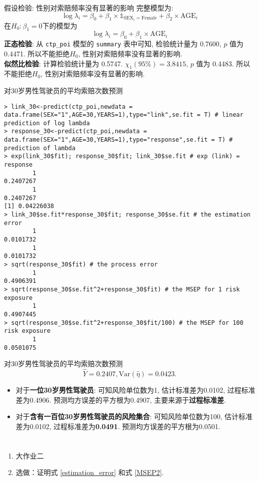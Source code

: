 \documentclass[professionalfont]{beamer}
\begin{document}
\begin{frame}{假设检验: 性别对索赔频率没有显著的影响}
	完整模型为: 
		\begin{equation*}
		\log\lambda_i=\beta_0+\beta_1\times\mathds{1}_{\text{SEX}_i=\text{Female}}+\beta_2\times\text{AGE}_i
		\end{equation*}
	在$H_0: \beta_1=0$下的模型为
$$\log\lambda_i=\beta_0+\beta_1\times\text{AGE}_i$$
	\textbf{正态检验}: 从 \texttt{ctp\_poi} 模型的 \texttt{summary} 表中可知, 检验统计量为 0.7600, $p$ 值为 0.4471. 所以不能拒绝$H_0$, 性别对索赔频率没有显著的影响.\\
	\textbf{似然比检验}: 计算检验统计量为 0.5747. $\chi_1(95\%)=3.8415$, $p$ 值为 0.4483. 所以不能拒绝$H_0$, 性别对索赔频率没有显著的影响.
\end{frame}
\begin{frame}[fragile]{对30岁男性驾驶员的平均索赔次数预测}
\begin{lstlisting}
> link_30<-predict(ctp_poi,newdata = data.frame(SEX="1",AGE=30,YEARS=1),type="link",se.fit = T) # linear prediction of log lambda
> response_30<-predict(ctp_poi,newdata = data.frame(SEX="1",AGE=30,YEARS=1),type="response",se.fit = T) # prediction of lambda
> exp(link_30$fit); response_30$fit; link_30$se.fit # exp (link) = response
        1 
0.2407267 
        1 
0.2407267 
[1] 0.04226038
> link_30$se.fit*response_30$fit; response_30$se.fit # the estimation  error
        1 
0.0101732 
        1 
0.0101732 
> sqrt(response_30$fit) # the process error
        1 
0.4906391 
> sqrt(response_30$se.fit^2+response_30$fit) # the MSEP for 1 risk exposure
        1 
0.4907445 
> sqrt(response_30$se.fit^2+response_30$fit/100) # the MSEP for 100 risk exposure
        1 
0.0501075 
\end{lstlisting}
\end{frame}
\begin{frame}{对30岁男性驾驶员的平均索赔次数预测}
$$\hat{Y}=0.2407, \text{Var}(\hat{\eta})=0.0423.$$
\begin{itemize}
\item  对于\textbf{一位30岁男性驾驶员}: 可知风险单位数为1, 估计标准差为0.0102, 过程标准差为0.4906. 预测均方误差的平方根为0.4907, 主要来源于\textbf{过程标准差}.\\
\item 对于\textbf{含有一百位30岁男性驾驶员的风险集合}: 可知风险单位数为100, 估计标准差为0.0102, 过程标准差为\textbf{0.0491}. 预测均方误差的平方根为0.0501.
\end{itemize}
\end{frame}

\section*{}
\begin{frame}
	\begin{enumerate}
		\item 大作业二
\item 选做：证明式 \eqref{estimation_error} 和式  \eqref{MSEP2}.

	\end{enumerate}
\end{frame}
\end{document}
